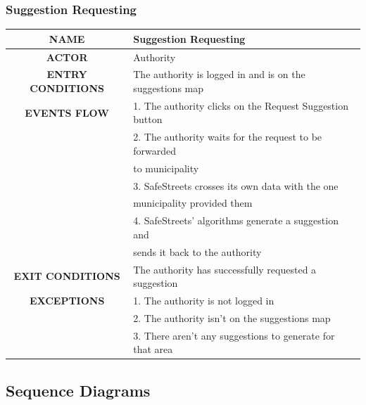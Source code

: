 \documentclass[12pt,a4paper]{article}
\begin{document}
\subsubsection{Suggestion Requesting}
\begin{center}
			\begin{tabular}{| c | l |}
				\hline
				\textbf{NAME} & Suggestion Requesting\\
				\hline
				\textbf{ACTOR} & Authority \\
				\hline
				\textbf{ENTRY CONDITIONS} & The authority is logged in and is on the suggestions map\\
				\hline
				\textbf{EVENTS FLOW}  &
				1. The authority clicks on the Request Suggestion button\\
				&2. The authority waits for the request to be forwarded\\
 				& to municipality\\ 
				&3. SafeStreets crosses its own data with the one\\ 
				& municipality provided them\\
				&4. SafeStreets' algorithms generate a suggestion and\\
				& sends it back to the authority \\
				\hline
				\textbf{EXIT CONDITIONS} & The authority has successfully requested a suggestion \\ 
				\hline
				\textbf{EXCEPTIONS} &
				1. The authority is not logged in\\
				&2. The authority isn't on the suggestions map\\
				&3. There aren't any suggestions to generate for that area\\
				\hline
			\end{tabular}
		\end{center}
\subsection{Sequence Diagrams}
\end{document}
